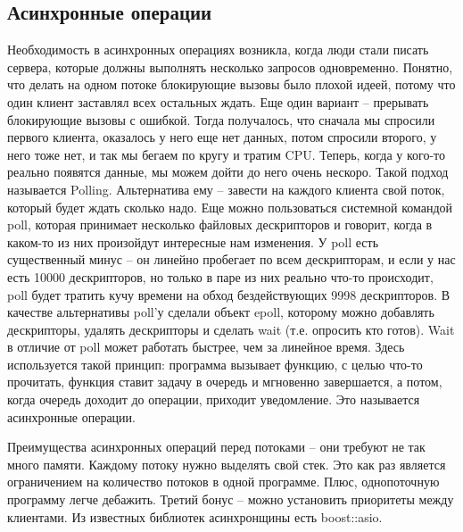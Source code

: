 \documentclass[12pt, a4paper]{article}
\begin{document}
\subsection{Асинхронные операции}
Необходимость в асинхронных операциях возникла, когда люди стали писать сервера, которые должны выполнять несколько запросов одновременно. Понятно, что делать на одном потоке блокирующие вызовы было плохой идеей, потому что один клиент заставлял всех остальных ждать. Еще один вариант -- прерывать блокирующие вызовы с ошибкой. Тогда получалось, что сначала мы спросили первого клиента, оказалось у него еще нет данных, потом спросили второго, у него тоже нет, и так мы бегаем по кругу и тратим CPU. Теперь, когда у кого-то реально появятся данные, мы можем дойти до него очень нескоро. Такой подход называется Polling. Альтернатива ему -- завести на каждого клиента свой поток, который будет ждать сколько надо. Еще можно пользоваться системной командой poll, которая принимает несколько файловых дескрипторов и говорит, когда в каком-то из них произойдут интересные нам изменения. У poll есть существенный минус -- он линейно пробегает по всем дескрипторам, и если у нас есть 10000 дескрипторов, но только в паре из них реально что-то происходит, poll будет тратить кучу времени на обход бездействующих 9998 дескрипторов. В качестве альтернативы poll'у сделали объект epoll, которому можно добавлять дескрипторы, удалять дескрипторы и сделать wait (т.е. опросить кто готов). Wait в отличие от poll может работать быстрее, чем за линейное время. Здесь используется такой принцип: программа вызывает функцию, с целью что-то прочитать, функция ставит задачу в очередь и мгновенно завершается, а потом, когда очередь доходит до операции, приходит уведомление. Это называется асинхронные операции.
\par Преимущества асинхронных операций перед потоками -- они требуют не так много памяти. Каждому потоку нужно выделять свой стек. Это как раз является ограничением на количество потоков в одной программе. Плюс, однопоточную программу легче дебажить. Третий бонус -- можно установить приоритеты между клиентами. Из известных библиотек асинхронщины есть boost::asio.\\
\end{document}
